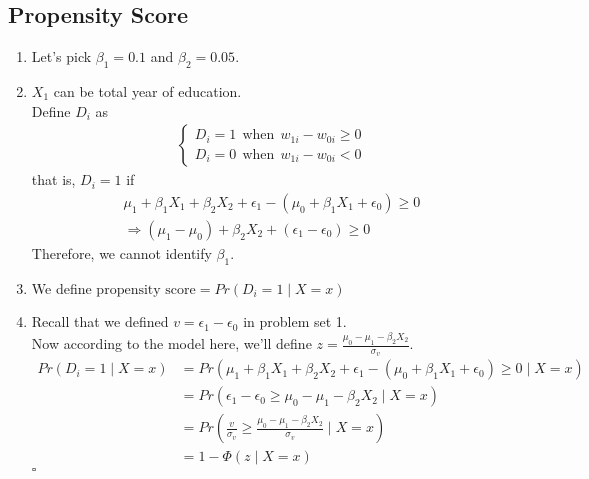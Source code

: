 \documentclass[12pt]{article}
\newcommand*{\QEDA}{\null\nobreak\hfill\ensuremath{\square}}%
\begin{document}
\subsection{Propensity Score} \label{PS}
\begin{enumerate}
      \item Let's pick $\beta_1 = 0.1$ and $\beta_2 = 0.05$.
      \item $X_1$ can be total year of education. \\ 
            Define $D_i$ as 
            \begin{align}
                  \begin{cases}
                        D_i = 1\ \ \text{when}\ \ w_{1i} - w_{0i} \geq 0 \\
                        D_i = 0\ \ \text{when}\ \ w_{1i} - w_{0i} < 0 \nonumber
                  \end{cases}
            \end{align}
            that is, $D_i = 1$ if
            \begin{align}
                  \mu_1 + \beta_1 X_1 + \beta_2 X_2 + \epsilon_1 - (\mu_0 + \beta_1 X_1 + \epsilon_0) \geq 0 \nonumber \\
                  \Rightarrow (\mu_1 - \mu_0) + \beta_2 X_2 + (\epsilon_1 - \epsilon_0) \geq 0 \nonumber     
            \end{align}
            Therefore, we cannot identify $\beta_1$.
      \item We define $\text{propensity score} = Pr(D_i = 1 \mid X = x)$
      \item Recall that we defined $v = \epsilon_1 - \epsilon_0$ in problem set 1. \\ 
            Now according to the model here, we'll define $z = \frac{\mu_0 - \mu_1 - \beta_2 X_2}{\sigma_v}$.
            \begin{align}
                  Pr(D_i = 1 \mid X = x) & = Pr(\mu_1 + \beta_1 X_1 + \beta_2 X_2 + \epsilon_1 - (\mu_0 + \beta_1 X_1 + \epsilon_0) \geq 0 \mid X = x) \nonumber \\ 
                                         & = Pr(\epsilon_1 - \epsilon_0 \geq \mu_0 - \mu_1 - \beta_2 X_2 \mid X = x) \nonumber \\ 
                                         & = Pr(\frac{v}{\sigma_v} \geq \frac{\mu_0 - \mu_1 - \beta_2 X_2}{\sigma_v} \mid X = x) \nonumber \\ 
                                         & = 1 - \Phi (z \mid X = x) \nonumber 
            \end{align} \QEDA

\end{enumerate}
\end{document}
